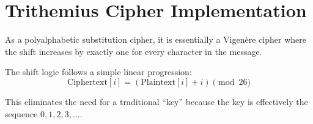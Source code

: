 \section*{Trithemius Cipher Implementation}

As a polyalphabetic substitution cipher, it is essentially a Vigenère cipher where
the shift increases by exactly one for every character in the message.

The shift logic follows a simple linear progression:
\[ \text{Ciphertext}[i] = (\text{Plaintext}[i] + i) \pmod{26} \]

This eliminates the need for a traditional ``key'' because the key is effectively the sequence $0, 1, 2, 3, \dots$.
